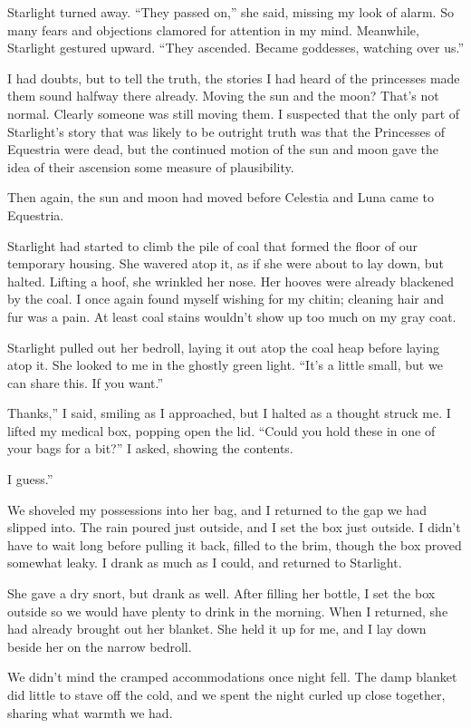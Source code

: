 Starlight turned away. “They passed on,” she said, missing my look of alarm. So many fears and objections clamored for attention in my mind. Meanwhile, Starlight gestured upward. “They ascended. Became goddesses, watching over us.”

I had doubts, but to tell the truth, the stories I had heard of the princesses made them sound halfway there already. Moving the sun and the moon? That’s not normal. Clearly someone was still moving them. I suspected that the only part of Starlight’s story that was likely to be outright truth was that the Princesses of Equestria were dead, but the continued motion of the sun and moon gave the idea of their ascension some measure of plausibility.

Then again, the sun and moon had moved before Celestia and Luna came to Equestria.

Starlight had started to climb the pile of coal that formed the floor of our temporary housing. She wavered atop it, as if she were about to lay down, but halted. Lifting a hoof, she wrinkled her nose. Her hooves were already blackened by the coal. I once again found myself wishing for my chitin; cleaning hair and fur was a pain. At least coal stains wouldn’t show up too much on my gray coat.

Starlight pulled out her bedroll, laying it out atop the coal heap before laying atop it. She looked to me in the ghostly green light. “It’s a little small, but we can share this. If you want.”

\leavevmode{}Thanks,” I said, smiling as I approached, but I halted as a thought struck me. I lifted my medical box, popping open the lid. “Could you hold these in one of your bags for a bit?” I asked, showing the contents.

\leavevmode{}I guess.”

We shoveled my possessions into her bag, and I returned to the gap we had slipped into. The rain poured just outside, and I set the box just outside. I didn’t have to wait long before pulling it back, filled to the brim, though the box proved somewhat leaky. I drank as much as I could, and returned to Starlight.

She gave a dry snort, but drank as well. After filling her bottle, I set the box outside so we would have plenty to drink in the morning. When I returned, she had already brought out her blanket. She held it up for me, and I lay down beside her on the narrow bedroll.

We didn’t mind the cramped accommodations once night fell. The damp blanket did little to stave off the cold, and we spent the night curled up close together, sharing what warmth we had.

